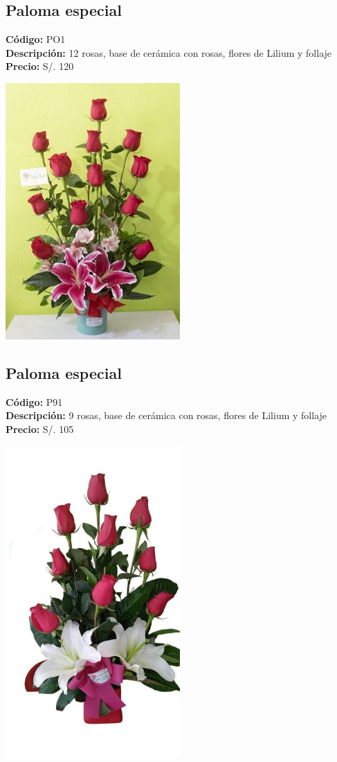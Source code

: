 \subsection*{Paloma especial}
\textbf{Código:} PO1 \\
\textbf{Descripción:} 12 rosas, base de cerámica con rosas, flores de Lilium y follaje \\
\textbf{Precio:} S/. 120 \\
\begin{center}
\includegraphics[width=0.5\textwidth]{imagenes_extraidas/image_9_2}
\end{center}
\subsection*{Paloma especial}
\textbf{Código:} P91 \\
\textbf{Descripción:} 9 rosas, base de cerámica con rosas, flores de Lilium y follaje \\
\textbf{Precio:} S/. 105 \\
\begin{center}
\includegraphics[width=0.5\textwidth]{imagenes_extraidas/image_9_5}
\end{center}
